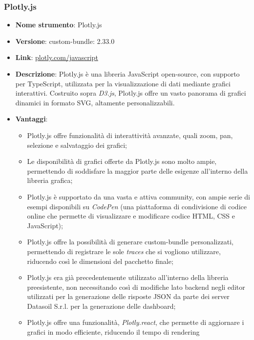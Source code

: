 \subsubsection{Plotly.js}
\begin{itemize}
      \item \textbf{Nome strumento}: Plotly.js
      \item \textbf{Versione}: custom-bundle: 2.33.0
      \item \textbf{Link}: \href{https://plotly.com/javascript/}{plotly.com/javascript}
      \item \textbf{Descrizione}: Plotly.js è una libreria JavaScript open-source, con supporto per TypeScript, utilizzata per la visualizzazione di dati mediante grafici interattivi.
            Costruito sopra \textit{D3.js}, Plotly.js offre un vasto panorama di grafici dinamici in formato SVG, altamente personalizzabili.
      \item \textbf{Vantaggi}:
            \begin{itemize}
                  \item Plotly.js offre funzionalità di interattività avanzate, quali zoom, pan, selezione e salvataggio dei grafici;
                  \item Le disponibilità di grafici offerte da Plotly.js sono molto ampie, permettendo di soddisfare la maggior parte delle esigenze
                        all'interno della libreria grafica;
                  \item Plotly.js è supportato da una vasta e attiva community, con ampie serie di esempi disponibili su \textit{CodePen} (una piattaforma di condivisione di codice
                        online che permette di visualizzare e modificare codice HTML, CSS e JavaScript);
                  \item Plotly.js offre la possibilità di generare custom-bundle personalizzati, permettendo di registrare le sole \textit{traces} che si vogliono utilizzare, riducendo
                        così le dimensioni del pacchetto finale;
                  \item Plotly.js era già precedentemente utilizzato all'interno della libreria preesistente, non necessitando così di modifiche lato backend negli editor
                        utilizzati per la generazione delle risposte JSON da parte dei server Datasoil S.r.l. per la generazione delle dashboard;
                  \item Plotly.js offre una funzionalità, \textit{Plotly.react}, che permette di aggiornare i grafici in modo efficiente, riducendo il tempo di rendering

\end{itemize}
\end{itemize}
